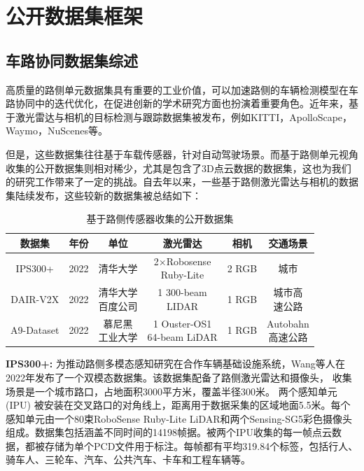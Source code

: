 \newpage
{}
\section{公开数据集框架}

\subsection{车路协同数据集综述}

高质量的路侧单元数据集具有重要的工业价值，可以加速路侧的车辆检测模型在车路协同中的迭代优化，在促进创新的学术研究方面也扮演着重要角色。近年来，基于激光雷达与相机的目标检测与跟踪数据集被发布，例如KITTI\cite{geiger2012we}，ApolloScape\cite{huang2018apolloscape}，Waymo\cite{sun2020scalability}，NuScenes\cite{caesar2020nuscenes}等。

但是，这些数据集往往基于车载传感器，针对自动驾驶场景。而基于路侧单元视角收集的公开数据集则相对稀少，尤其是包含了3D点云数据的数据集，这也为我们的研究工作带来了一定的挑战。自去年以来，一些基于路侧激光雷达与相机的数据集陆续发布，这些较新的数据集被总结如下：\cite{sun2022object}

\begin{table}[htbp]
\centering
\caption{基于路侧传感器收集的公开数据集}
\begin{tabular}{c c c c c c}
\toprule
数据集 & 年份 & 单位 & 激光雷达 & 相机 & 交通场景 \\
\midrule
IPS300+\cite{wang2022ips300+} &2022 & 清华大学 & \makecell{2×Robosense \\ Ruby-Lite} & 2 RGB & 城市 \\
DAIR-V2X\cite{yu2022dair} & 2022 & \makecell{清华大学\\百度公司} & \makecell{1 300-beam \\ LIDAR} & 1 RGB & \makecell{城市高\\速公路} \\
A9-Dataset\cite{cress2022a9} & 2022 & \makecell{慕尼黑\\工业大学} & \makecell{1 Ouster-OS1 \\ 64-beam LiDAR} & 1 RGB & \makecell{Autobahn\\高速公路} \\
\bottomrule
\end{tabular}
\end{table}

\textbf{IPS300+:} 为推动路侧多模态感知研究在合作车辆基础设施系统，Wang等人\cite{wang2022ips300+}在2022年发布了一个双模态数据集。该数据集配备了路侧激光雷达和摄像头， 收集场景是一个城市路口，占地面积3000平方米，覆盖半径300米。 两个感知单元 (IPU) 被安装在交叉路口的对角线上，距离用于数据采集的区域地面5.5米。每个感知单元由一个80束RoboSense Ruby-Lite LiDAR和两个Sensing-SG5彩色摄像头组成。数据集包括涵盖不同时间的14198帧据。被两个IPU收集的每一帧点云数据，都被存储为单个PCD文件用于标注。每帧都有平均319.84个标签，包括行人、骑车人、三轮车、汽车、公共汽车、卡车和工程车辆等。

